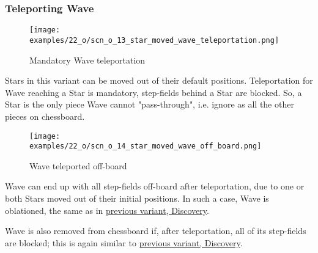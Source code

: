 \clearpage %

\subsubsection*{Teleporting Wave}

\vspace*{-0.9\baselineskip}
\noindent
\begin{figure}[!h]
\texttt{[image: examples/22\_o/scn\_o\_13\_star\_moved\_wave\_teleportation.png]}
\caption{Mandatory Wave teleportation}
\label{fig:scn_o_13_star_moved_wave_teleportation}
\end{figure}

Stars in this variant can be moved out of their default positions. Teleportation for Wave
reaching a Star is mandatory, step-fields behind a Star are blocked. So, a Star is the only
piece Wave cannot "pass-through", i.e. ignore as all the other pieces on chessboard.

\clearpage %

\vspace*{-2.1\baselineskip}
\noindent
\begin{figure}[!h]
\texttt{[image: examples/22\_o/scn\_o\_14\_star\_moved\_wave\_off\_board.png]}
\caption{Wave teleported off-board}
\label{fig:scn_o_14_star_moved_wave_off_board}
\end{figure}

Wave can end up with all step-fields off-board after teleportation, due to one or both Stars
moved out of their initial positions. In such a case, Wave is oblationed, the same as in
\hyperref[fig:scn_d_11_wave_teleported_off_board]{previous variant, Discovery}.

Wave is also removed from chessboard if, after teleportation, all of its step-fields are
blocked; this is again similar to
\hyperref[fig:scn_d_10_teleported_wave_blocked]{previous variant, Discovery}.

\clearpage %

